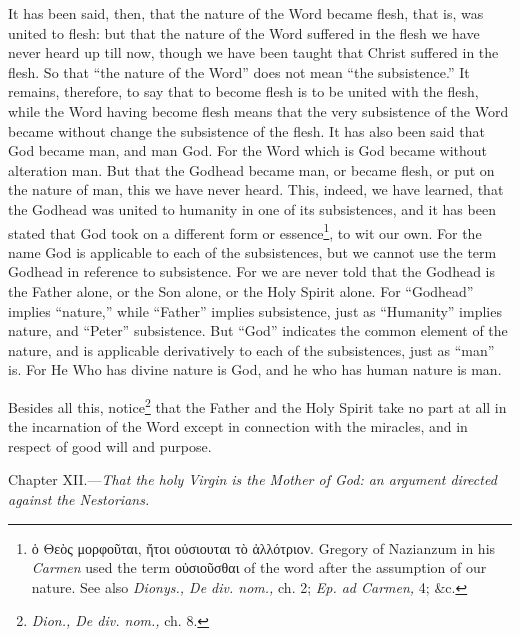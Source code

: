 It has been said, then, that the nature of the Word became flesh, that is, was united to flesh: but that the nature of the Word suffered in the flesh we have never heard up till now, though we have been taught that Christ suffered in the flesh. So that “the nature of the Word” does not mean “the subsistence.” It remains, therefore, to say that to become flesh is to be united with the flesh, while the Word having become flesh means that the very subsistence of the Word became without change the subsistence of the flesh. It has also been said that God became man, and man God. For the Word which is God became without alteration man. But that the Godhead became man, or became flesh, or put on the nature of man, this we have never heard. This, indeed, we have learned, that the Godhead was united to humanity in one of its subsistences, and it has been stated that God took on a different form or essence\footnote{\textgreek{ὁ Θεὸς μορφοῦται, ἤτοι οὐσιουται τὸ ἀλλότριον}. Gregory of Nazianzum in his \emph{Carmen }used the term \textgreek{οὐσιοῦσθαι} of the word after the assumption of our nature. See also \emph{Dionys., De div. nom., }ch. 2; \emph{Ep. ad Carmen, }4; \&c.}, to wit our own. For the name God is applicable to each of the subsistences, but we cannot use the term Godhead in reference to subsistence. For we are never told that the Godhead is the Father alone, or the Son alone, or the Holy Spirit alone. For “Godhead” implies “nature,” while “Father” implies subsistence, just as “Humanity” implies nature, and “Peter” subsistence. But “God” indicates the common element of the nature, and is applicable derivatively to each of the subsistences, just as “man” is. For He Who has divine nature is God, and he who has human nature is man.

Besides all this, notice\footnote{\emph{Dion., De div. nom., }ch. 8.} that the Father and the Holy Spirit take no part at all in the incarnation of the Word except in connection with the miracles, and in respect of good will and purpose.


Chapter XII.—\emph{That the holy Virgin is the Mother of God: an argument directed against the Nestorians.}

